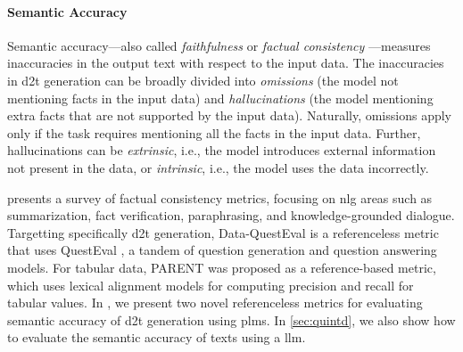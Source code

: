 {\paragraph{Semantic Accuracy} Semantic accuracy---also called \emph{faithfulness} or \emph{factual consistency} \cite{celikyilmazEvaluationTextGeneration2021}---measures inaccuracies in the output text with respect to the input data. The inaccuracies in \ac{d2t} generation can be broadly divided into \emph{omissions} (the model not mentioning facts in the input data) and \emph{hallucinations} (the model mentioning extra facts that are not supported by the input data). Naturally, omissions apply only if the task requires mentioning all the facts in the input data. Further, hallucinations can be \emph{extrinsic}, i.e., the model introduces external information not present in the data, or \emph{intrinsic}, i.e., the model uses the data incorrectly. \cite{maynezFaithfulnessFactualityAbstractive2020}


\citet{honovich2022true} presents a survey of factual consistency metrics, focusing on \ac{nlg} areas such as summarization, fact verification, paraphrasing, and knowledge-grounded dialogue. Targetting specifically \ac{d2t} generation, Data-QuestEval \cite{rebuffel2021data} is a referenceless metric that uses QuestEval \cite{scialomQuestEvalSummarizationAsks2021}, a tandem of question generation and question answering models. For tabular data, PARENT \cite{dhingraHandlingDivergentReference2019} was proposed as a reference-based metric, which uses lexical alignment models for computing precision and recall for tabular values. In , we present two novel referenceless metrics for evaluating semantic accuracy of \ac{d2t} generation using \acp{plm}. In \autoref{sec:quintd}, we also show how to evaluate the semantic accuracy of texts using a \ac{llm}.

}
